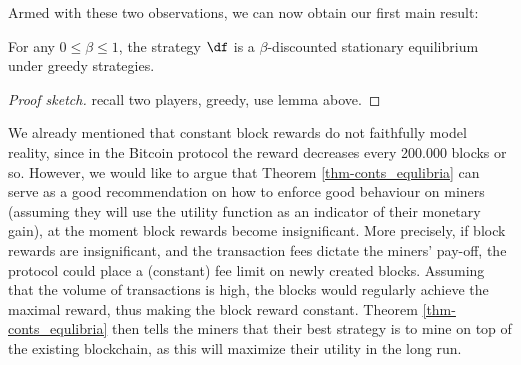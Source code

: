 %
%
%
%
%

Armed with these two observations, we can now obtain our first main result:

\begin{mythm}\label{thm-conts_equlibria}
For any $0 \leq \beta \leq 1$, the strategy $\df$ is a $\beta$-discounted stationary equilibrium under greedy strategies. 
\end{mythm} 

\begin{proof}[Proof sketch]
recall two players, greedy, use lemma above. 
\end{proof}

We already mentioned that constant block rewards do not faithfully model reality, since in the Bitcoin protocol the reward decreases every 200.000 blocks or so. However, we would like to argue that Theorem \ref{thm-conts_equlibria} can serve as a good recommendation on how to enforce good behaviour on miners (assuming they will use the utility function as an indicator of their monetary gain), at the moment block rewards become insignificant. More precisely, if block rewards are insignificant, and the transaction fees dictate the miners' pay-off, the protocol could place a (constant) fee limit on newly created blocks. Assuming that the volume of transactions is high, the blocks would regularly achieve the maximal reward, thus making the block reward constant. Theorem \ref{thm-conts_equlibria} then tells the miners that their best strategy is to mine on top of the existing blockchain, as this will maximize their utility in the long run.